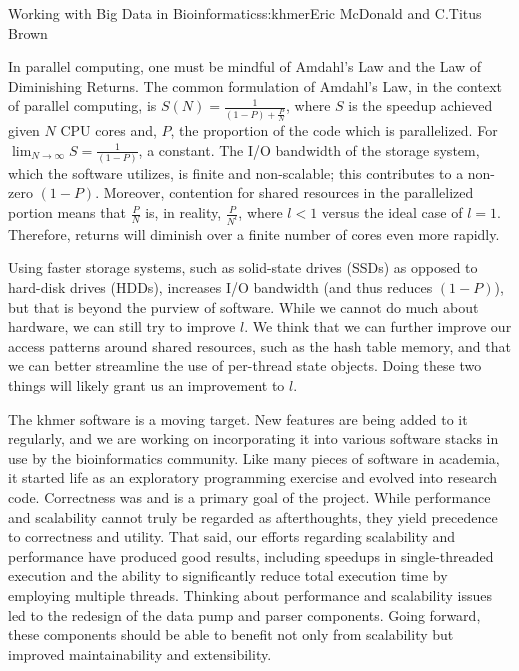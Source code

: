 \begin{aosachapter}{Working with Big Data in Bioinformatics}{s:khmer}{Eric McDonald and C.\/Titus Brown}

In parallel computing, one must be mindful of Amdahl's Law
\cite{web:Amdahl} and the Law of Diminishing Returns. The common
formulation of Amdahl's Law, in the context of parallel computing, is
$S(N) = \frac{1}{(1 - P) + \frac{P}{N}}$, where $S$ is the speedup
achieved given $N$ CPU cores and, $P$, the proportion of the code which
is parallelized. For $\lim_{N\to\infty} S = \frac{1}{(1 - P)}$, a
constant. The I/O bandwidth of the storage system, which the software
utilizes, is finite and non-scalable; this contributes to a non-zero
$(1 - P)$. Moreover, contention for shared resources in the parallelized
portion means that $\frac{P}{N}$ is, in reality, $\frac{P}{N^l}$, where
$l < 1$ versus the ideal case of $l = 1$. Therefore, returns will
diminish over a finite number of cores even more rapidly.

Using faster storage systems, such as solid-state drives (SSDs) as
opposed to hard-disk drives (HDDs), increases I/O bandwidth (and thus
reduces $(1 - P)$), but that is beyond the purview of software. While we
cannot do much about hardware, we can still try to improve $l$. We think
that we can further improve our access patterns around shared resources,
such as the hash table memory, and that we can better streamline the use
of per-thread state objects. Doing these two things will likely grant us
an improvement to $l$.


The khmer software is a moving target. New features are being added to
it regularly, and we are working on incorporating it into various
software stacks in use by the bioinformatics community. Like many pieces
of software in academia, it started life as an exploratory programming
exercise and evolved into research code. Correctness was and is a
primary goal of the project. While performance and scalability cannot
truly be regarded as afterthoughts, they yield precedence to correctness
and utility. That said, our efforts regarding scalability and
performance have produced good results, including speedups in
single-threaded execution and the ability to significantly reduce total
execution time by employing multiple threads. Thinking about performance
and scalability issues led to the redesign of the data pump and parser
components. Going forward, these components should be able to benefit
not only from scalability but improved maintainability and
extensibility.


\end{aosachapter}
